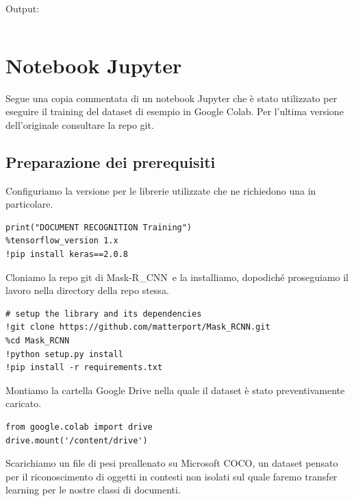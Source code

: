 \documentclass[12pt,a4paper]{article}
\newcommand{\mrcnn}{Mask-R\_CNN}
\begin{document}
Output:
\inputminted{python}{test_background.py}

\pagebreak

\section{Notebook Jupyter}
\label{s:notebook}


Segue una copia commentata di un notebook Jupyter che è stato utilizzato
per eseguire il training del dataset di esempio in Google Colab. Per
l'ultima versione dell'originale consultare la repo git.

\subsection{Preparazione dei prerequisiti}

Configuriamo la versione per le librerie utilizzate che ne richiedono
una in particolare.

\begin{verbatim}
print("DOCUMENT RECOGNITION Training")
%tensorflow_version 1.x
!pip install keras==2.0.8
\end{verbatim}

Cloniamo la repo git di \mrcnn\ e la installiamo, dopodiché proseguiamo
il lavoro nella directory della repo stessa.

\begin{verbatim}
# setup the library and its dependencies
!git clone https://github.com/matterport/Mask_RCNN.git
%cd Mask_RCNN
!python setup.py install
!pip install -r requirements.txt
\end{verbatim}

Montiamo la cartella Google Drive nella quale il dataset è stato
preventivamente caricato.

\begin{verbatim}
from google.colab import drive
drive.mount('/content/drive')
\end{verbatim}

Scarichiamo un file di pesi preallenato su Microsoft COCO, un dataset
pensato per il riconoscimento di oggetti in contesti non isolati sul
quale faremo transfer learning per le nostre classi di documenti.
\end{document}
